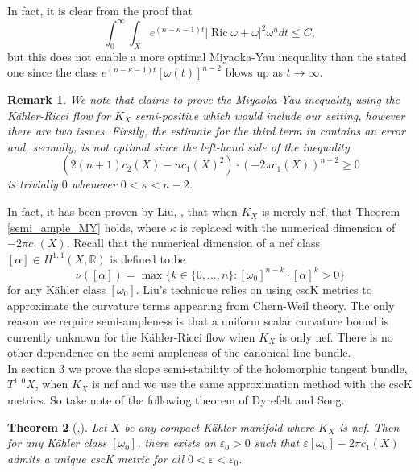 \documentclass[12pt]{article}
\newtheorem{theorem}{Theorem}[section]
\newtheorem{remark}[theorem]{Remark}
\numberwithin{equation}{section}
\newcommand{\R}{\mathbb{R}}
\newcommand{\e}{\varepsilon}
\DeclareMathOperator{\Ric}{Ric}
\begin{document}
\noindent In fact, it is clear from the proof that
\begin{equation}\label{semi_ample_L2_ricci_limit}
    \int_0^\infty \int_X e^{(n-\kappa-1)t} |\Ric \omega + \omega|^2 \omega^n dt \leq C,
\end{equation}
but this does not enable a more optimal Miyaoka-Yau inequality than the stated one since the class $e^{(n-\kappa-1)t}[\omega(t)]^{n-2}$ blows up as $t \to \infty$.

\begin{remark}
We note that \cite{N21} claims to prove the Miyaoka-Yau inequality using the K\"ahler-Ricci flow for $K_X$ semi-positive which would include our setting, however there are two issues. Firstly, the estimate for the third term in \cite[Eq. (2.4)]{N21} contains an error and, secondly, is not optimal since the left-hand side of the inequality
\begin{equation*}
    (2 (n+1) c_2(X) - n c_1(X)^2) \cdot (-2 \pi c_1(X))^{n-2} \geq 0
\end{equation*}
is trivially $0$ whenever $0 < \kappa < n-2$.
\end{remark}

\noindent In fact, it has been proven by Liu, \cite{L23}, that when $K_X$ is merely nef, that Theorem \ref{semi_ample_MY} holds, where $\kappa$ is replaced with the numerical dimension of $-2\pi c_1(X)$. Recall that the numerical dimension of a nef class $[\alpha] \in H^{1,1}(X,\R)$ is defined to be 
\begin{equation*}
    \nu([\alpha]) = \max\{k \in \{0,\dots,n\}: [\omega_0]^{n-k} \cdot [\alpha]^k > 0\}
\end{equation*}
for any K\"ahler class $[\omega_0]$. Liu's technique relies on using cscK metrics to approximate the curvature terms appearing from Chern-Weil theory. The only reason we require semi-ampleness is that a uniform scalar curvature bound is currently unknown for the K\"ahler-Ricci flow when $K_X$ is only nef. There is no other dependence on the semi-ampleness of the canonical line bundle.\\

\noindent In section $3$ we prove the slope semi-stability of the holomorphic tangent bundle, $T^{1,0} X$, when $K_X$ is nef and we use the same approximation method with the cscK metrics. So take note of the following theorem of Dyrefelt and Song.

\begin{theorem}[\cite{D20},\cite{S20}]
Let $X$ be any compact K\"ahler manifold where $K_X$ is nef. Then for any K\"ahler class $[\omega_0]$, there exists an $\e_0 > 0$ such that $\e[\omega_0] - 2 \pi c_1(X)$ admits a unique cscK metric for all $0 < \e < \e_0$.
\end{theorem}
\end{document}
